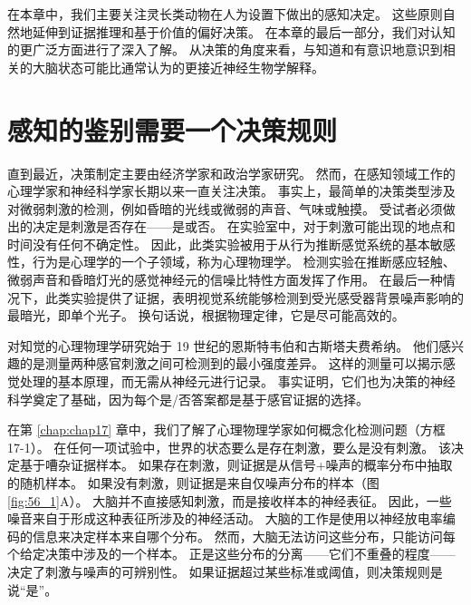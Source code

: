 在本章中，我们主要关注灵长类动物在人为设置下做出的感知决定。 这些原则自然地延伸到证据推理和基于价值的偏好决策。 在本章的最后一部分，我们对认知的更广泛方面进行了深入了解。 从决策的角度来看，与知道和有意识地意识到相关的大脑状态可能比通常认为的更接近神经生物学解释。

\section{感知的鉴别需要一个决策规则}

直到最近，决策制定主要由经济学家和政治学家研究。 然而，在感知领域工作的心理学家和神经科学家长期以来一直关注决策。 事实上，最简单的决策类型涉及对微弱刺激的检测，例如昏暗的光线或微弱的声音、气味或触摸。 受试者必须做出的决定是刺激是否存在——是或否。 在实验室中，对于刺激可能出现的地点和时间没有任何不确定性。 因此，此类实验被用于从行为推断感觉系统的基本敏感性，行为是心理学的一个子领域，称为心理物理学。 检测实验在推断感应轻触、微弱声音和昏暗灯光的感觉神经元的信噪比特性方面发挥了作用。 在最后一种情况下，此类实验提供了证据，表明视觉系统能够检测到受光感受器背景噪声影响的最暗光，即单个光子。 换句话说，根据物理定律，它是尽可能高效的。

对知觉的心理物理学研究始于 19 世纪的恩斯特韦伯和古斯塔夫费希纳。 他们感兴趣的是测量两种感官刺激之间可检测到的最小强度差异。 这样的测量可以揭示感觉处理的基本原理，而无需从神经元进行记录。 事实证明，它们也为决策的神经科学奠定了基础，因为每个是/否答案都是基于感官证据的选择。

在第 \ref{chap:chap17} 章中，我们了解了心理物理学家如何概念化检测问题（方框 17-1）。 在任何一项试验中，世界的状态要么是存在刺激，要么是没有刺激。 该决定基于嘈杂证据样本。 如果存在刺激，则证据是从信号+噪声的概率分布中抽取的随机样本。 如果没有刺激，则证据是来自仅噪声分布的样本（图 \ref{fig:56_1}A）。 大脑并不直接感知刺激，而是接收样本的神经表征。 因此，一些噪音来自于形成这种表征所涉及的神经活动。 大脑的工作是使用以神经放电率编码的信息来决定样本来自哪个分布。 然而，大脑无法访问这些分布，只能访问每个给定决策中涉及的一个样本。 正是这些分布的分离——它们不重叠的程度——决定了刺激与噪声的可辨别性。 如果证据超过某些标准或阈值，则决策规则是说“是”。

